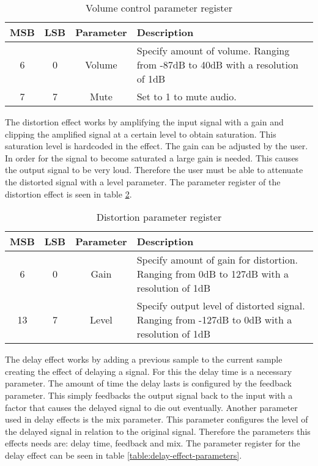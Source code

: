 \begin{table}[h!]
    \centering
    \begin{tabular}{|c|c|c|p{3.5in}|}
        \hline
        MSB & LSB & Parameter & Description\\
        \hline
        6 & 0 & Volume & Specify amount of volume. Ranging from -87dB to 40dB with a resolution of 1dB\\
        \hline
        7 & 7 & Mute & Set to 1 to mute audio.\\
        \hline
    \end{tabular}
    \caption{Volume control parameter register}
    \label{table:volume-effect-parameters}
\end{table}

The distortion effect works by amplifying the input signal with a gain and clipping the amplified signal at a certain level to obtain saturation. This saturation level is hardcoded in the effect. The gain can be adjusted by the user. In order for the signal to become saturated a large gain is needed. This causes the output signal to be very loud. Therefore the user must be able to attenuate the distorted signal with a level parameter. The parameter register of the distortion effect is seen in table \ref{table:distortion-effect-parameters}.

\begin{table}[h!]
    \centering
    \begin{tabular}{|c|c|c|p{3.5in}|}
        \hline
        MSB & LSB & Parameter & Description\\
        \hline
        6 & 0 & Gain & Specify amount of gain for distortion. Ranging from 0dB to 127dB with a resolution of 1dB\\
        \hline
        13 & 7 & Level & Specify output level of distorted signal. Ranging from -127dB to 0dB with a resolution of 1dB\\
        \hline
    \end{tabular}
    \caption{Distortion parameter register}
    \label{table:distortion-effect-parameters}
\end{table}

The delay effect works by adding a previous sample to the current sample creating the effect of delaying a signal. For this the delay time is a necessary parameter. The amount of time the delay lasts is configured by the feedback parameter. This simply feedbacks the output signal back to the input with a factor that causes the delayed signal to die out eventually. Another parameter used in delay effects is the mix parameter. This parameter configures the level of the delayed signal in relation to the original signal. Therefore the parameters this effects needs are: delay time, feedback and mix. The parameter register for the delay effect can be seen in table \ref{table:delay-effect-parameters}.

